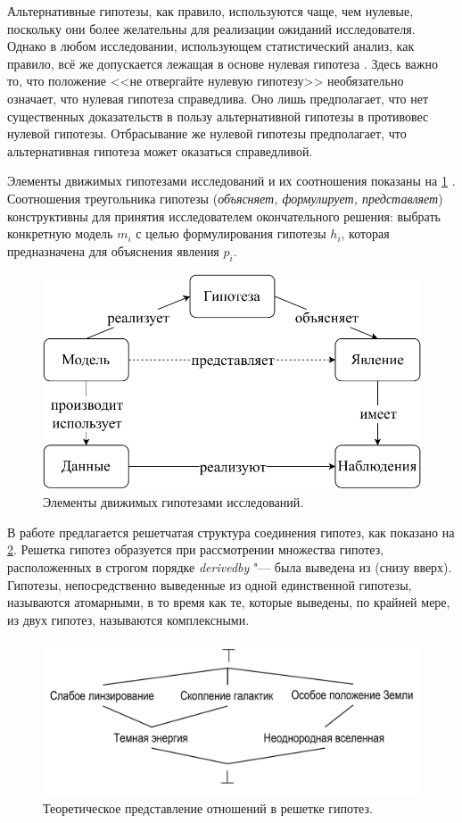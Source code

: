 Альтернативные гипотезы, как правило, используются чаще, чем нулевые, поскольку они более желательны для реализации 
ожиданий исследователя. Однако в любом исследовании, использующем статистический анализ, как правило, всё же 
допускается лежащая в основе нулевая гипотеза \cite{Haber2009}. Здесь важно то, что положение <<не отвергайте нулевую 
гипотезу>> необязательно означает, что нулевая гипотеза справедлива. Оно лишь предполагает, что нет существенных 
доказательств в пользу альтернативной гипотезы в противовес нулевой гипотезы. Отбрасывание же нулевой гипотезы 
предполагает, что альтернативная гипотеза может оказаться справедливой.

Элементы движимых гипотезами исследований и их соотношения показаны на \cref{fig:hypothesis_real} 
\cite{Goncalves2013, Porto2011}. Соотношения треугольника гипотезы (\textit{объясняет, формулирует, представляет}) 
конструктивны для принятия исследователем окончательного решения: выбрать конкретную модель $m_i$ с целью 
формулирования гипотезы $h_i$, которая предназначена для объяснения явления $p_i$. 

\begin{figure}[ht]
    \centering
    \includegraphics[width=0.7\linewidth]{images/hypothesis_real}
    \caption{Элементы движимых гипотезами исследований.}\label{fig:hypothesis_real}
\end{figure}

В работе \cite{Goncalves2013} предлагается решетчатая структура соединения гипотез, как показано на 
\cref{fig:hypothesis_relation}. Решетка гипотез образуется при рассмотрении множества гипотез, расположенных 
в строгом порядке \textit{derived\textunderscore by} "--- была выведена из (снизу вверх). Гипотезы, 
непосредственно выведенные из одной единственной гипотезы, называются атомарными, в то время как те, которые выведены, 
по крайней мере, из двух гипотез, называются комплексными.

\begin{figure}[ht]
    \centering
    \includegraphics[width=0.7\linewidth]{images/hypothesis_relation.pdf}
    \caption{Теоретическое представление отношений в решетке гипотез.}\label{fig:hypothesis_relation}
\end{figure}

